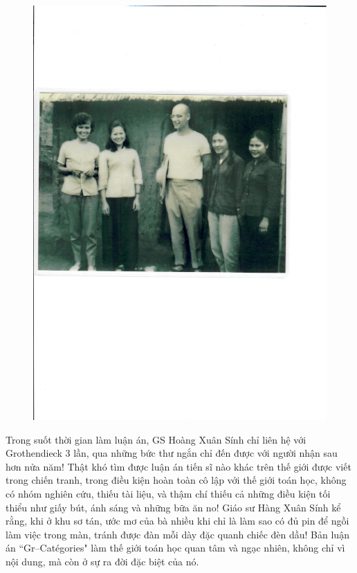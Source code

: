 \begin{multicols}{2}
\begin{figure}[H]
		\includegraphics[width= 1\linewidth]{Anh3}
		\vspace*{-10pt}
	\end{figure}
	Trong suốt thời gian làm luận án, GS Hoàng Xuân Sính chỉ liên hệ với Grothendieck $3$ lần, qua những bức thư ngắn chỉ đến được với người nhận sau hơn nửa năm! Thật khó tìm được luận án tiến sĩ nào khác trên thế giới được viết trong chiến tranh, trong điều kiện hoàn toàn cô lập với thế giới toán học, không có nhóm nghiên cứu, thiếu tài liệu, và thậm chí thiếu cả những điều kiện tối thiểu như giấy bút, ánh sáng và những bữa ăn no! Giáo sư Hàng Xuân Sính kể rằng, khi ở khu sơ tán, ước mơ của bà nhiều khi chỉ là làm sao có đủ pin để ngồi làm việc trong màn, tránh được đàn mỗi dày đặc quanh chiếc đèn dầu!
	\vskip 0.1cm
	Bản luận án ``Gr--Catégories" làm thế giới toán học quan tâm và ngạc nhiên, không chỉ vì nội dung, mà còn ở sự ra đời đặc biệt của nó. 

\end{multicols}
